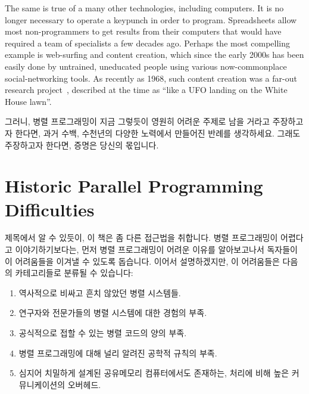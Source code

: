 The same is true of a many other technologies, including computers.
It is no longer necessary to operate a keypunch in order to program.
Spreadsheets allow most non-programmers to get results from their computers
that would have required a team of specialists a few decades ago.
Perhaps the most compelling example is web-surfing and content creation,
which since the early 2000s has been easily done by
untrained, uneducated people using various now-commonplace
social-networking tools.
As recently as 1968, such content creation was a far-out research
project~\cite{DouglasEngelbart1968}, described at
the time as
``like a UFO landing on the White House lawn''\cite{ScottGriffen2000}.
\fi

그러니, 병렬 프로그래밍이 지금 그렇듯이 영원히 어려운 주제로 남을 거라고
주장하고자 한다면, 과거 수백, 수천년의 다양한 노력에서 만들어진 반례를
생각하세요. 그래도 주장하고자 한다면, 증명은 당신의 몫입니다.

\section{Historic Parallel Programming Difficulties}
\label{sec:intro:Historic Parallel Programming Difficulties}

제목에서 알 수 있듯이, 이 책은 좀 다른 접근법을 취합니다.
병렬 프로그래밍이 어렵다고 이야기하기보다는, 먼저 병렬 프로그래밍이 어려운
이유를 알아보고나서 독자들이 이 어려움들을 이겨낼 수 있도록 돕습니다.
이어서 설명하겠지만, 이 어려움들은 다음의 카테고리들로 분류될 수 있습니다:

\begin{enumerate}
\item	역사적으로 비싸고 흔치 않았던 병렬 시스템들.
\item	연구자와 전문가들의 병렬 시스템에 대한 경험의 부족.
\item	공식적으로 접할 수 있는 병렬 코드의 양의 부족.
\item	병렬 프로그래밍에 대해 널리 알려진 공학적 규칙의 부족.
\item	심지어 치밀하게 설계된 공유메모리 컴퓨터에서도 존재하는, 처리에 비해
	높은 커뮤니케이션의 오버헤드.
\end{enumerate}
\iffalse

